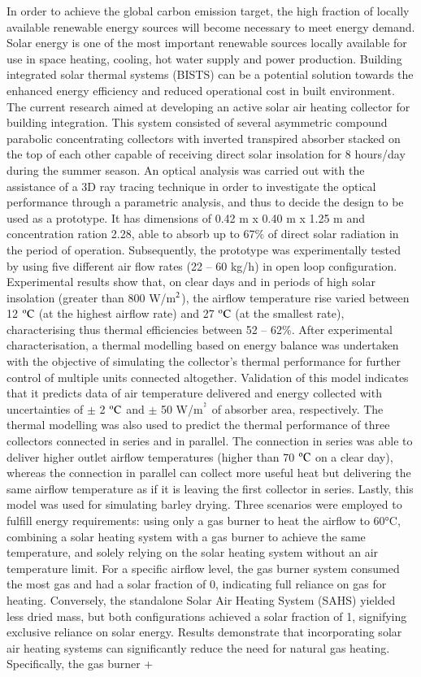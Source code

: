 In order to achieve the global carbon emission target, the high fraction of locally available renewable energy sources will become necessary to meet energy demand. Solar energy is one of the most important renewable sources locally available for use in space heating, cooling, hot water supply and power production. Building integrated solar thermal systems (BISTS) can be a potential solution towards the enhanced energy efficiency and reduced operational cost in built environment. The current research aimed at developing an active solar air heating collector for building integration. This system consisted of several asymmetric compound parabolic concentrating collectors with inverted transpired absorber stacked on the top of each other capable of receiving direct solar insolation for 8 hours/day during the summer season. An optical analysis was carried out with the assistance of a 3D ray tracing technique in order to investigate the optical performance through a parametric analysis, and thus to decide the design to be used as a prototype. It has dimensions of 0.42 m x 0.40 m x 1.25 m and concentration ration 2.28, able to absorb up to 67\% of direct solar radiation in the period of operation. Subsequently, the prototype was experimentally tested by using five different air flow rates (22 -- 60 kg/h) in open loop configuration. Experimental results show that, on clear days and in periods of high solar insolation (greater than 800 W/m$^{\rm{2}}$), the airflow temperature rise varied between 12 $\rm{^oC}$ (at the highest airflow rate) and 27 $\rm{^oC}$ (at the smallest rate), characterising thus thermal efficiencies between 52 -- 62\%. After experimental characterisation, a thermal modelling based on energy balance was undertaken with the objective of simulating the collector’s thermal performance for further control of multiple units connected altogether. Validation of this model indicates that it predicts data of air temperature delivered and energy collected with uncertainties of $\pm$ 2 $\rm{^oC}$ and $\pm$ 50 W/m$^{\rm{^2}}$ of absorber area, respectively. The thermal modelling was also used to predict the thermal performance of three collectors connected in series and in parallel. The connection in series was able to deliver higher outlet airflow temperatures (higher than 70 $\rm{^oC}$ on a clear day), whereas the connection in parallel can collect more useful heat but delivering the same airflow temperature as if it is leaving the first collector in series. Lastly, this model was used for simulating barley drying. Three scenarios were employed to fulfill energy requirements: using only a gas burner to heat the airflow to 60°C, combining a solar heating system with a gas burner to achieve the same temperature, and solely relying on the solar heating system without an air temperature limit. For a specific airflow level, the gas burner system consumed the most gas and had a solar fraction of 0, indicating full reliance on gas for heating. Conversely, the standalone Solar Air Heating System (SAHS) yielded less dried mass, but both configurations achieved a solar fraction of 1, signifying exclusive reliance on solar energy. Results demonstrate that incorporating solar air heating systems can significantly reduce the need for natural gas heating. Specifically, the gas burner + 